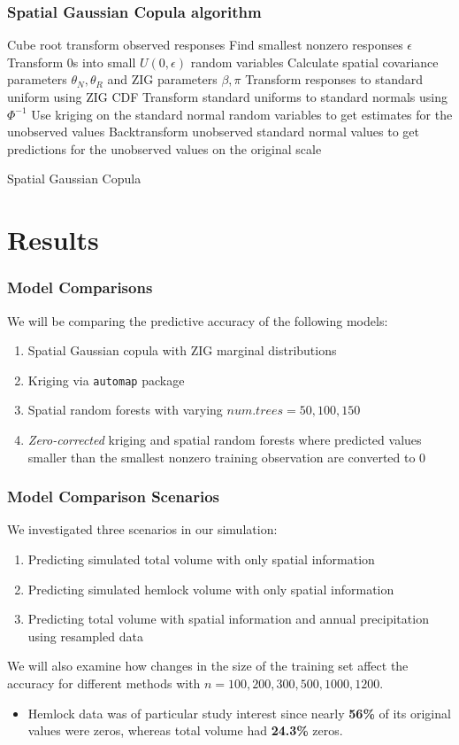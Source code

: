 \documentclass{beamer}
\begin{document}
\begin{frame}
	\frametitle{Spatial Gaussian Copula algorithm}
	\begin{algorithm}[H]
	\SetAlgoLined
	 {
		Cube root transform observed responses\; 
		Find smallest nonzero responses $\epsilon$ \;
		Transform 0s into small $U(0, \epsilon)$ random variables\;
		Calculate spatial covariance parameters $\theta_N, \theta_R$ and ZIG parameters $\beta, \pi$\;
		Transform responses to standard uniform using ZIG CDF \; 
		Transform standard uniforms to standard normals using $\Phi^{-1}$ \; 
		Use kriging on the standard normal random variables to get estimates for the unobserved values \;
		Backtransform unobserved standard normal values to get predictions for the unobserved values on the original scale\; 
	}
		\caption{Spatial Gaussian Copula}
	\end{algorithm}
\end{frame}

\section{Results}
\begin{frame}
	\frametitle{Model Comparisons}
	We will be comparing the predictive accuracy of the following models:
	\begin{enumerate}
		\item Spatial Gaussian copula with ZIG marginal distributions
		\item Kriging via \texttt{automap} package
		\item Spatial random forests with varying $num.trees = 50, 100, 150$
		\item \textit{Zero-corrected} kriging and spatial random forests where predicted values smaller than the smallest nonzero training observation are converted to 0
	\end{enumerate}
\end{frame}

\begin{frame}
	\frametitle{Model Comparison Scenarios}
	We investigated three scenarios in our simulation:
	\begin{enumerate}
		\item Predicting simulated total volume with only spatial information
		\item Predicting simulated hemlock volume with only spatial information
		\item Predicting total volume with spatial information and annual precipitation using resampled data
	\end{enumerate}
	We will also examine how changes in the size of the training set affect the accuracy for different methods with $n = 100, 200, 300, 500, 1000, 1200$.
	\begin{itemize}
		\item Hemlock data was of particular study interest since nearly \textbf{56\%} of its original values were zeros, whereas total volume had \textbf{24.3\%} zeros.
	\end{itemize}
\end{frame}
\end{document}
